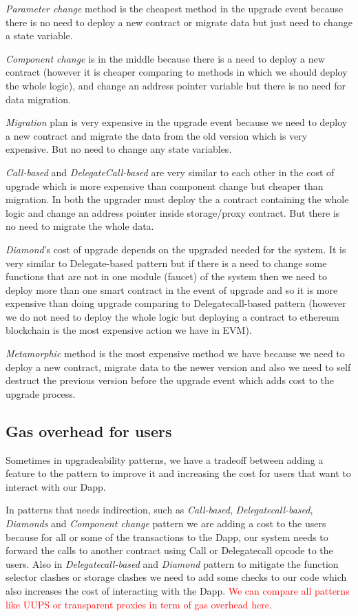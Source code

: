  \textit{Parameter change} method is the cheapest method in the upgrade event because there is no need to deploy a new contract or migrate data but just need to change a state variable.

 \textit{Component change} is in the middle because there is a need to deploy a new contract (however it is cheaper comparing to methods in which we should deploy the whole logic), and change an address pointer variable but there is no need for data migration.

 \textit{Migration} plan is very expensive in the upgrade event because we need to deploy a new contract and migrate the data from the old version which is very expensive. But no need to change any state variables.

 \textit{Call-based} and \textit{DelegateCall-based} are very similar to each other in the cost of upgrade which is more expensive than component change but cheaper than migration. In both the upgrader must deploy the a contract containing the whole logic and change an address pointer inside storage/proxy contract. But there is no need to migrate the whole data.
 
 \textit{Diamond}'s cost of upgrade depends on the upgraded needed for the system. It is very similar to Delegate-based pattern but if there is a need to change some functions that are not in one module (faucet) of the system then we need to deploy more than one smart contract in the event of upgrade and so it is more expensive than doing upgrade comparing to Delegatecall-based pattern (however we do not need to deploy the whole logic but deploying a contract to ethereum blockchain is the most expensive action we have in EVM).

 \textit{Metamorphic} method is the most expensive method we have because we need to deploy a new contract, migrate data to the newer version and also we need to self destruct the previous version before the upgrade event which adds cost to the upgrade process.

\subsection{Gas overhead for users}
Sometimes in upgradeability patterns, we have a tradeoff between adding a feature to the pattern to improve it and increasing the cost for users that want to interact with our Dapp.

In patterns that needs indirection, such as \textit{Call-based}, \textit{Delegatecall-based}, \textit{Diamonds} and \textit{Component change} pattern we are adding a cost to the users because for all or some of the transactions to the Dapp, our system needs to forward the calls to another contract using Call or Delegatecall opcode to the users. 
Also in \textit{Delegatecall-based} and \textit{Diamond} pattern to mitigate the function selector clashes or storage clashes we need to add some checks to our code which also increases the cost of interacting with the Dapp. \textcolor{red}{We can compare all patterns like UUPS or transparent proxies in term of gas overhead here}.


